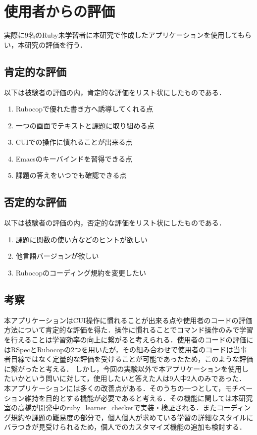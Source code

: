 \chapter{使用者からの評価}\label{evaluation}
実際に9名のRuby未学習者に本研究で作成したアプリケーションを使用してもらい，本研究の評価を行う．

\section{肯定的な評価}\label{list}
以下は被験者の評価の内，肯定的な評価をリスト状にしたものである．
\begin{enumerate}
\def\labelenumi{\arabic{enumi}.}
\tightlist
\item
  Rubocopで優れた書き方へ誘導してくれる点
\item
  一つの画面でテキストと課題に取り組める点
\item
  CUIでの操作に慣れることが出来る点
\item
  Emacsのキーバインドを習得できる点
\item
  課題の答えをいつでも確認できる点
\end{enumerate}

\section{否定的な評価}\label{list}
以下は被験者の評価の内，否定的な評価をリスト状にしたものである．
\begin{enumerate}
\def\labelenumi{\arabic{enumi}.}
\tightlist
\item
  課題に関数の使い方などのヒントが欲しい
\item
  他言語バージョンが欲しい
\item
  Rubocopのコーディング規約を変更したい
\end{enumerate}

\section{考察}\label{list}
本アプリケーションはCUI操作に慣れることが出来る点や使用者のコードの評価方法について肯定的な評価を得た．操作に慣れることでコマンド操作のみで学習を行えることは学習効率の向上に繋がると考えられる．使用者のコードの評価にはRSpecとRubocopの2つを用いたが，その組み合わせで使用者のコードは当事者目線ではなく定量的な評価を受けることが可能であったため，このような評価に繋がったと考える．
しかし，今回の実験以外で本アプリケーションを使用したいかという問いに対して，使用したいと答えた人は9人中2人のみであった．
本アプリケーションには多くの改善点がある．そのうちの一つとして，モチベーション維持を目的とする機能が必要であると考える．その機能に関しては本研究室の高橋が開発中のruby\_learner\_checkerで実装・検証される．またコーディング規約や課題の難易度の部分で，個人個人が求めている学習の詳細なスタイルにバラつきが見受けられるため，個人でのカスタマイズ機能の追加も検討する．
